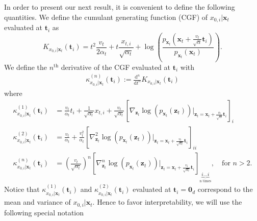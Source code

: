 %
%
In order to present our next result, it is convenient to define the following quantities. We define the cumulant generating function (CGF) of $x_{0,i} \vert \mathbf{x}_t$ evaluated at $\mathbf{t}_{i}$ as
\begin{equation}
\label{eq:cumulant_generating_function}
K_{x_{0,i} \vert \mathbf{x}_t}(\mathbf{t}_{i}) = t^{2}\frac{v_{t}}{2\alpha_{t}} + t\frac{x_{t,i}}{\sqrt{\alpha_{t}}} + \log\left(\frac{p_{\mathbf{x}_t}\left(\mathbf{x}_{t}+\frac{v_{t}}{\sqrt{\alpha}}\mathbf{t}_{i}\right)}{p_{\mathbf{x}_t}\left(\mathbf{x}_{t}\right)}\right).
\end{equation} 
We define the $n^{\text{th}}$ derivative of the CGF evaluated at $\mathbf{t}_{i}$ with
\begin{align}
\label{eq:derivative_cumulant_generating_function}
    \kappa^{(n)}_{x_{0,i} \vert \mathbf{x}_t}(\mathbf{t}_{i}) := \frac{\mathrm{d}^{n}}{\mathrm{d}t^{n}} K_{x_{0,i} \vert \mathbf{x}_t}(\mathbf{t}_i)
\end{align}
where
\begin{equation}
\begin{aligned}
\kappa^{(1)}_{x_{0,i} \vert \mathbf{x}_t}(\mathbf{t}_{i})  &= \frac{v_{t}}{\alpha_{t}} t_{i} + \frac{1}{\sqrt{\alpha_{t}}} x_{t,i} + \frac{v_{t}}{\sqrt{\alpha_{t}}}\left[\nabla_{\mathbf{z}_{t}}\log\left(p_{\mathbf{x}_t}\left(\mathbf{z}_{t}\right)\right) \vert_{\mathbf{z}_{t}=\mathbf{x}_{t}+\frac{v_{t}}{\sqrt{\alpha}}\mathbf{t}_{i}}\right]_{i} \\  
\kappa^{(2)}_{x_{0,i} \vert \mathbf{x}_t}(\mathbf{t}_{i})&=  \frac{v_{t}}{\alpha_{t}} +\frac{v_{t}^{2}}{\alpha_{t}}\left[ \nabla_{\mathbf{z}_t}^{2}\log\left(p_{\mathbf{x}_t}\left(\mathbf{z}_t\right)\right)\vert_{\mathbf{z}_t = \mathbf{x}_{t}+\frac{v_{t}}{\sqrt{\alpha_t}}\mathbf{t}_{i}}\right]_{ii}\\
\kappa^{(n)}_{x_{0,i} \vert \mathbf{x}_t}(\mathbf{t}_{i}) &=\left(\frac{v_{t}} {\sqrt{\alpha_{t}}}\right)^n\left[ \nabla_{\mathbf{z}_t}^{n}\log\left(p_{\mathbf{x}_t}\left(\mathbf{z}_t\right)\right)\vert_{\mathbf{z}_t = \mathbf{x}_{t}+\frac{v_{t}}{\sqrt{\alpha_t}}\mathbf{t}_{i}}\right]_{\underbrace{i \ldots i}_{\text{n times}}}, \quad \text{for } n >2.
\end{aligned}
\end{equation}
Notice that $\kappa^{(1)}_{x_{0,i} \vert \mathbf{x}_t}(\mathbf{t}_{i})$ and $\kappa^{(2)}_{x_{0,i} \vert \mathbf{x}_t}(\mathbf{t}_{i})$ evaluated at $\mathbf{t}_{i} = \mathbf{0}_d$ correspond to the mean and variance of $x_{0,i} \vert \mathbf{x}_t$. Hence to favor interpretability, we will use the following special notation 
